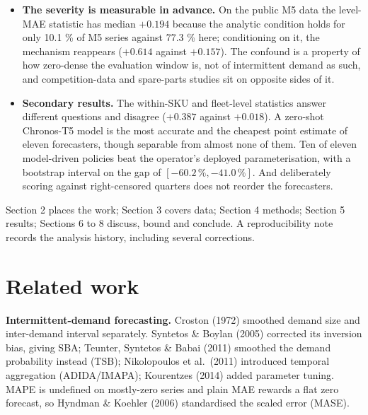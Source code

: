 \documentclass[11pt]{article}
\begin{document}
\begin{itemize}
  than established, while a generic five-quantile CRPS is strictly worse than
  MAE (paired difference $-0.107$, interval excluding zero). The comparison
  rests on the four models that emit quantiles.
\item \textbf{The severity is measurable in advance.} On the public M5 data
  the level-MAE statistic has median $+0.194$ because the analytic condition
  holds for only 10.1 \% of M5 series against 77.3 \% here; conditioning on
  it, the mechanism reappears ($+0.614$ against $+0.157$). The confound is a
  property of how zero-dense the evaluation window is, not of intermittent
  demand as such, and competition-data and spare-parts studies sit on opposite
  sides of it.
\item \textbf{Secondary results.} The within-SKU and fleet-level statistics
  answer different questions and disagree ($+0.387$ against $+0.018$). A
  zero-shot Chronos-T5 model is the most accurate and the cheapest point
  estimate of eleven forecasters, though separable from almost none of them.
  Ten of eleven model-driven policies beat the operator's deployed
  parameterisation, with a bootstrap interval on the gap of
  $[-60.2\,\%, -41.0\,\%]$. And deliberately scoring against right-censored
  quarters does not reorder the forecasters.
\end{itemize}

Section 2 places the work; Section 3 covers data; Section 4 methods; Section 5
results; Sections 6 to 8 discuss, bound and conclude. A reproducibility note
records the analysis history, including several corrections.

\section{Related work}

\textbf{Intermittent-demand forecasting.} Croston (1972) smoothed demand size
and inter-demand interval separately. Syntetos \& Boylan (2005) corrected its
inversion bias, giving SBA; Teunter, Syntetos \& Babai (2011) smoothed the
demand probability instead (TSB); Nikolopoulos et al.\ (2011) introduced
temporal aggregation (ADIDA/IMAPA); Kourentzes (2014) added parameter tuning.
MAPE is undefined on mostly-zero series and plain MAE rewards a flat zero
forecast, so Hyndman \& Koehler (2006) standardised the scaled error (MASE).
\end{document}
